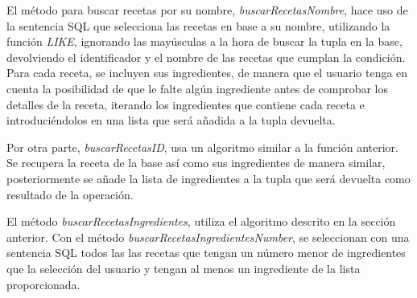 El método para buscar recetas por su nombre, \textit{buscarRecetasNombre}, hace uso de la sentencia \gls{SQL} que selecciona las recetas en base a su nombre, utilizando la función \textit{LIKE},  ignorando las mayúsculas a la hora de buscar la \gls{tupla} en la \gls{base}, devolviendo el identificador y el nombre de las recetas que cumplan la condición.
Para cada receta, se incluyen sus ingredientes, de manera que el usuario tenga en cuenta la posibilidad de que le falte algún ingrediente antes de comprobar los detalles de la receta, iterando los ingredientes que contiene cada receta e introduciéndolos en una lista que será añadida a la \gls{tupla} devuelta.

Por otra parte, \textit{buscarRecetasID}, usa un algoritmo similar a la función anterior. Se recupera la receta de la \gls{base} así como sus ingredientes de manera similar, posteriormente se añade la lista de ingredientes a la \gls{tupla} que será devuelta como resultado de la operación. 

El método \textit{buscarRecetasIngredientes}, utiliza el algoritmo descrito en la sección anterior. Con el método \emph{buscarRecetasIngredientesNumber}, se seleccionan con una sentencia \gls{SQL} todos las las recetas que tengan un número menor de ingredientes que la selección del usuario y tengan al menos un ingrediente de la lista proporcionada. 

